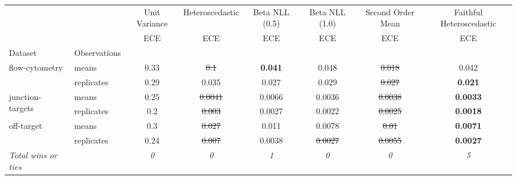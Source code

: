 \begin{tabular}{ll|c|c|c|c|c|c}
\toprule
{} & {} & {Unit Variance} & {Heteroscedastic} & {Beta NLL (0.5)} & {Beta NLL (1.0)} & {Second Order Mean} & {Faithful Heteroscedastic} \\
{} & {} & {ECE} & {ECE} & {ECE} & {ECE} & {ECE} & {ECE} \\
{Dataset} & {Observations} & {} & {} & {} & {} & {} & {} \\
\midrule
\multirow[t]{2}{*}{flow-cytometry} & means & 0.33 & \sout{0.1} & \textbf{0.041} & 0.048 & \sout{0.018} & 0.042 \\
 & replicates & 0.29 & 0.035 & 0.027 & 0.029 & \sout{0.027} & \textbf{0.021} \\
\multirow[t]{2}{*}{junction-targets} & means & 0.25 & \sout{0.0041} & 0.0066 & 0.0036 & \sout{0.0038} & \textbf{0.0033} \\
 & replicates & 0.2 & \sout{0.003} & 0.0027 & 0.0022 & \sout{0.0025} & \textbf{0.0018} \\
\multirow[t]{2}{*}{off-target} & means & 0.3 & \sout{0.027} & 0.011 & 0.0078 & \sout{0.01} & \textbf{0.0071} \\
 & replicates & 0.24 & \sout{0.007} & 0.0038 & \sout{0.0027} & \sout{0.0055} & \textbf{0.0027} \\
\textit{{Total wins or ties}} &  & \textit{0} & \textit{0} & \textit{1} & \textit{0} & \textit{0} & \textit{5} \\
\bottomrule
\end{tabular}
